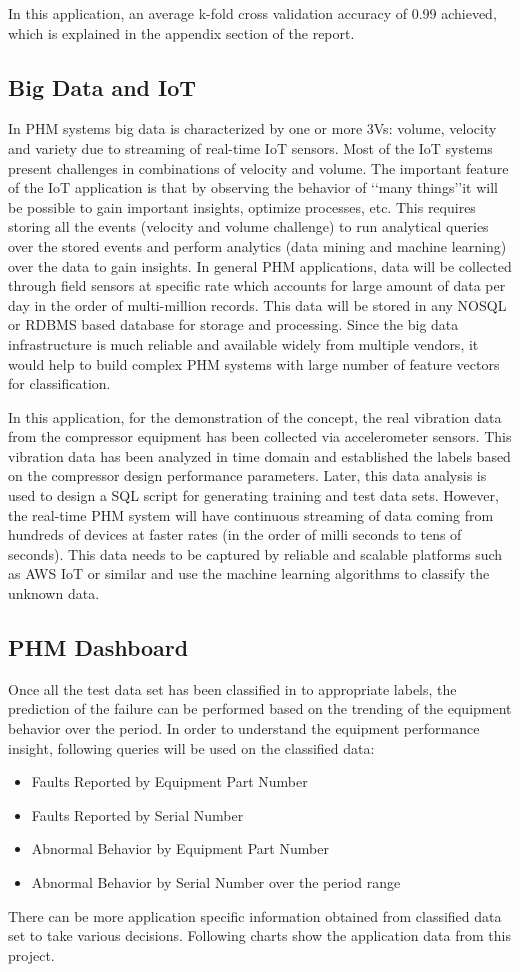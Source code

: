 \documentclass[sigconf]{acmart}
\begin{document}
In this application, an average k-fold cross validation accuracy of 0.99 achieved, which is explained in the appendix section of the report.

\subsection{Big Data and IoT}
In PHM systems big data is characterized by one or more 3Vs: volume, velocity and variety due to streaming of real-time IoT sensors. Most of the IoT systems present challenges in combinations of velocity and volume. The important feature of the IoT application is that by observing the behavior of \lq\lq many things\rq\rq it will be possible to gain important insights, optimize processes, etc. This requires storing all the events (velocity and volume challenge) to run analytical queries over the stored events and perform analytics (data mining and machine learning) over the data to gain insights.
In general PHM applications, data will be collected through field sensors at specific rate which accounts for large amount of data per day in the order of multi-million records. This data will be stored in any NOSQL or RDBMS based database for storage and processing. Since the big data infrastructure is much reliable and available widely from multiple vendors, it would help to build complex PHM systems with large number of feature vectors for classification. 

In this application, for the demonstration of the concept, the real vibration data from the compressor equipment has been collected via accelerometer sensors. This vibration data has been analyzed in time domain and established the labels based on the compressor design performance parameters. Later, this data analysis is used to design a SQL script for generating training and test data sets. However, the real-time PHM system will have continuous streaming of data coming from hundreds of devices at faster rates (in the order of milli seconds to tens of seconds). This data needs to be captured by reliable and scalable platforms such as AWS IoT or similar and use the machine learning algorithms to classify the unknown data.
\subsection{PHM Dashboard}
Once all the test data set has been classified in to appropriate labels, the prediction of the failure can be performed based on the trending of the equipment behavior over the period. In order to understand the equipment performance insight, following queries will be used on the classified data:
\begin{itemize}
  \item Faults Reported by Equipment Part Number
  \item Faults Reported by Serial Number
  \item Abnormal Behavior by Equipment Part Number
  \item Abnormal Behavior by Serial Number over the period range
\end{itemize}
There can be more application specific information obtained from classified data set to take various decisions. Following charts show the application data from this project.
\end{document}
